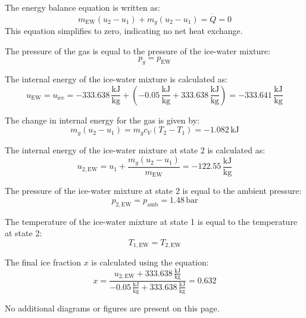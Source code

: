 The energy balance equation is written as:  
\[
m_{\text{EW}} (u_2 - u_1) + m_g (u_2 - u_1) = \dot{Q} = 0
\]  
This equation simplifies to zero, indicating no net heat exchange.

The pressure of the gas is equal to the pressure of the ice-water mixture:  
\[
p_g = p_{\text{EW}}
\]

The internal energy of the ice-water mixture is calculated as:  
\[
u_{\text{EW}} = u_{\text{ice}} = -333.638 \, \frac{\text{kJ}}{\text{kg}} + \left( -0.05 \, \frac{\text{kJ}}{\text{kg}} + 333.638 \, \frac{\text{kJ}}{\text{kg}} \right) = -333.641 \, \frac{\text{kJ}}{\text{kg}}
\]

The change in internal energy for the gas is given by:  
\[
m_g (u_2 - u_1) = m_g c_V (T_2 - T_1) = -1.082 \, \text{kJ}
\]

The internal energy of the ice-water mixture at state 2 is calculated as:  
\[
u_{2,\text{EW}} = u_1 + \frac{m_g (u_2 - u_1)}{m_{\text{EW}}} = -122.55 \, \frac{\text{kJ}}{\text{kg}}
\]

The pressure of the ice-water mixture at state 2 is equal to the ambient pressure:  
\[
p_{2,\text{EW}} = p_{\text{amb}} = 1.48 \, \text{bar}
\]

The temperature of the ice-water mixture at state 1 is equal to the temperature at state 2:  
\[
T_{1,\text{EW}} = T_{2,\text{EW}}
\]

The final ice fraction \( x \) is calculated using the equation:  
\[
x = \frac{u_{2,\text{EW}} + 333.638 \, \frac{\text{kJ}}{\text{kg}}}{-0.05 \, \frac{\text{kJ}}{\text{kg}} + 333.638 \, \frac{\text{kJ}}{\text{kg}}} = 0.632
\]  

No additional diagrams or figures are present on this page.